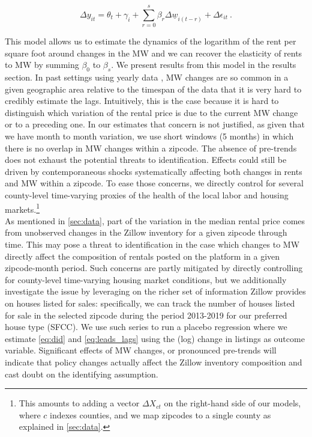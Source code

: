 \begin{equation}\label{eq:lags}
        \Delta y_{it} = \theta_t + \gamma_i 
        		+ \sum_{r=0}^{s}\beta_r \Delta \underline{w}_{i(t-r)} 
        		+ \Delta \epsilon_{it} \ .
\end{equation}

This model allows us to estimate the dynamics of the logarithm of the rent per square foot around 
changes in the MW and we can recover the elasticity of rents to MW by summing $\beta_0$ to 
$\beta_{s}$. We present results from this model in the results section. In past settings using 
yearly data \parencite{tidemann2018mw,yamagishi2019minimum}, MW changes are so common in a given 
geographic area relative to the timespan of the data that it is very hard to credibly estimate the 
lags. Intuitively, this is the case because it is hard to distinguish which variation of the rental 
price is due to the current MW change or to a preceding one. In our estimates that concern is not 
justified, as given that we have month to month variation, we use short windows (5 months) in which 
there is no overlap in MW changes within a zipcode. The absence of pre-trends does not exhaust the 
potential threats to identification. Effects could still be driven by contemporaneous shocks 
systematically affecting both changes in rents and MW within a zipcode. To ease those concerns, we 
directly control for several county-level time-varying proxies of the health of the local labor and 
housing markets.\footnote{This amounts to adding a vector $\Delta X_{ct}$ on the right-hand side of 
	our models, where $c$ indexes counties, and we map zipcodes to a single county as explained in 
	\autoref{sec:data}.} \\

As mentioned in \autoref{sec:data}, part of the variation in the median rental price comes from 
unobserved changes in the Zillow inventory for a given zipcode through time. This may pose a threat 
to identification in the case which changes to MW directly affect the composition of rentals posted on the platform in a given zipcode-month period. Such concerns are partly mitigated by directly controlling for county-level time-varying housing market conditions, but we additionally investigate the issue by leveraging on the richer set of information Zillow provides on houses listed for sales: specifically, we can track the number of houses listed for sale in the selected zipcode during the period 2013-2019 for our preferred house type (SFCC). We use such series to run a placebo regression where we estimate \autoref{eq:did} and \autoref{eq:leads_lags} using the (log) change in listings as outcome variable.  Significant effects of MW changes, or pronounced pre-trends will indicate that policy changes actually affect the Zillow inventory composition and cast doubt on the identifying assumption. \\



